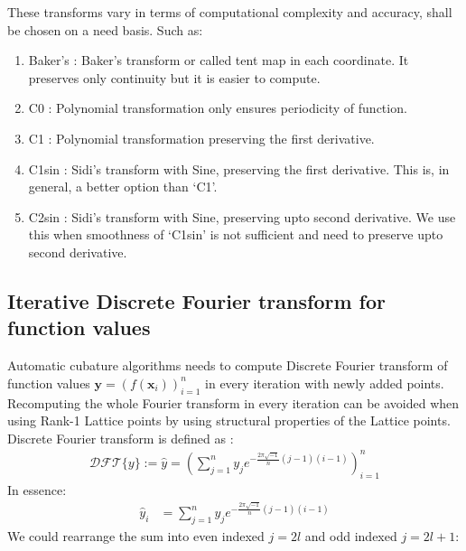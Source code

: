 \documentclass[smallextended]{svjour3}       %
\newcommand{\bm}[1]{\boldsymbol{#1}}
\newcommand{\vx}{\bm{x}}
\newcommand{\vy}{\bm{y}}
\begin{document}
These transforms vary in terms of computational complexity and accuracy, shall be chosen on a need basis.
Such as:
\begin{enumerate}
\item Baker's : Baker's transform or called tent map in each coordinate. It preserves only continuity but it is easier to compute.
\item C0 : Polynomial transformation only ensures periodicity of function.
\item C1 : Polynomial transformation preserving the first derivative.
\item C1sin : Sidi's transform with Sine, preserving the first derivative. This is, in general, a better option than `C1'.
\item C2sin : Sidi's transform with Sine, preserving upto second derivative. We use this when smoothness of `C1sin' is not sufficient and need to preserve upto second derivative.
\end{enumerate}






\subsection{Iterative Discrete Fourier transform for function values}

Automatic cubature algorithms needs to compute Discrete Fourier transform of function values $\vy = \left(f(\vx_i)\right)_{i=1}^n$ in every iteration with newly added points. Recomputing the whole Fourier transform in every iteration can be avoided when using Rank-1 Lattice points by using structural properties of the Lattice points.  
Discrete Fourier transform is defined as :
\begin{align*}
\mathcal{DFT} \{y \} := \hat{y} = \left( \sum_{j=1}^{n} y_j 
e^{-\frac{2\pi \sqrt{-1}}{n} (j-1) (i-1) }
\right)_{i=1}^{n}
\end{align*}
In essence:
\begin{align*}
\hat{y}_i &=  \sum_{j=1}^{n} y_j 
e^{- \frac{2\pi \sqrt{-1}}{n} (j-1) (i-1) }
\end{align*}
We could rearrange the sum into even indexed $j=2l$ and odd indexed $j=2 l + 1$:
\end{document}
